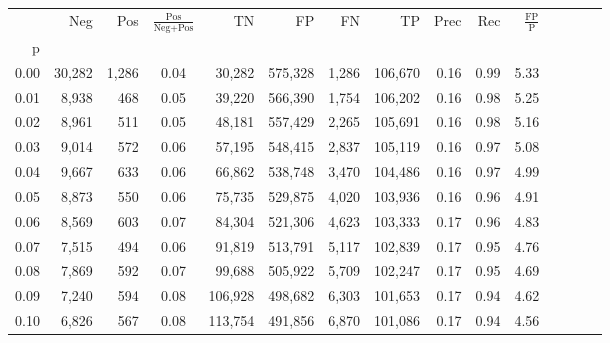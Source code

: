 \begin{tabular}{rrrcrrrrrrrrrrr}
\toprule
{} &     Neg &    Pos & $\frac{\text{Pos}}{\text{Neg}+\text{Pos}}$ &       TN &       FP &       FN &       TP &  Prec &   Rec & $\frac{\text{FP}}{\text{P}}$ \\
p    &         &        &                                            &          &          &          &          &       &       &                              \\
\midrule
0.00 &  30,282 &  1,286 &                                       0.04 &   30,282 &  575,328 &    1,286 &  106,670 &  0.16 &  0.99 &                         5.33 \\
0.01 &   8,938 &    468 &                                       0.05 &   39,220 &  566,390 &    1,754 &  106,202 &  0.16 &  0.98 &                         5.25 \\
0.02 &   8,961 &    511 &                                       0.05 &   48,181 &  557,429 &    2,265 &  105,691 &  0.16 &  0.98 &                         5.16 \\
0.03 &   9,014 &    572 &                                       0.06 &   57,195 &  548,415 &    2,837 &  105,119 &  0.16 &  0.97 &                         5.08 \\
0.04 &   9,667 &    633 &                                       0.06 &   66,862 &  538,748 &    3,470 &  104,486 &  0.16 &  0.97 &                         4.99 \\
0.05 &   8,873 &    550 &                                       0.06 &   75,735 &  529,875 &    4,020 &  103,936 &  0.16 &  0.96 &                         4.91 \\
0.06 &   8,569 &    603 &                                       0.07 &   84,304 &  521,306 &    4,623 &  103,333 &  0.17 &  0.96 &                         4.83 \\
0.07 &   7,515 &    494 &                                       0.06 &   91,819 &  513,791 &    5,117 &  102,839 &  0.17 &  0.95 &                         4.76 \\
0.08 &   7,869 &    592 &                                       0.07 &   99,688 &  505,922 &    5,709 &  102,247 &  0.17 &  0.95 &                         4.69 \\
0.09 &   7,240 &    594 &                                       0.08 &  106,928 &  498,682 &    6,303 &  101,653 &  0.17 &  0.94 &                         4.62 \\
0.10 &   6,826 &    567 &                                       0.08 &  113,754 &  491,856 &    6,870 &  101,086 &  0.17 &  0.94 &                         4.56 \\

\end{tabular}
